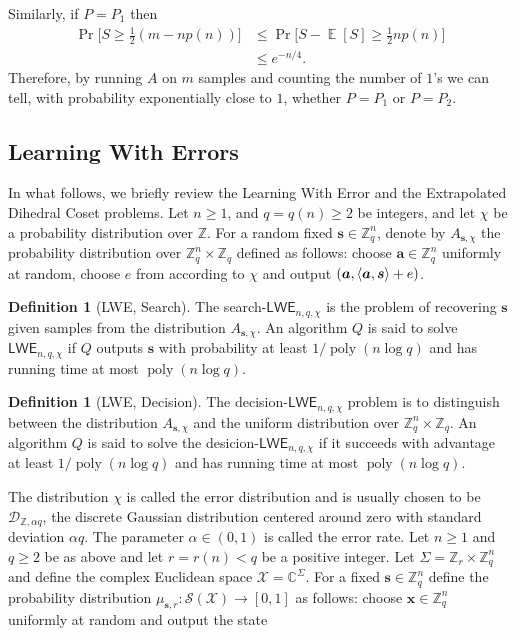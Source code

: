 \documentclass[11pt]{article}
\theoremstyle{plain}
\theoremstyle{definition}
\newtheorem{definition}[theorem]{Definition}
\DeclareMathOperator{\poly}{poly}
\DeclareMathOperator{\E}{\mathbb{E}}
\DeclarePairedDelimiter{\lrang}{\langle}{\rangle}
\def\C{\mathbb{C}}
\def\Z{\mathbb{Z}}
\def\lwe{\mathsf{LWE}}
\def\X{\mathcal{X}}
\def\SX{\mathcal{S(X)}}
\begin{document}
Similarly, if $P = P_1$ then
\begin{align*}
    \Pr\Big[ S \ge \frac{1}{2} (m - np(n)) \Big]
    & \le \Pr\Big[ S - \E[S] \ge \frac{1}{2}np(n) \Big] \\
    & \le e^{-n / 4}.
\end{align*}
Therefore, by running $A$ on $m$ samples and counting the number of $1$'s we can tell, with probability exponentially close to $1$, whether $P = P_1$ or $P = P_2$.



\subsection{Learning With Errors}

In what follows, we briefly review the Learning With Error and the Extrapolated Dihedral Coset problems. Let $n \ge 1$, and $q = q(n) \ge 2$ be integers, and let $\chi$ be a probability distribution over $\Z$. For a random fixed $\bm{s} \in \Z_q^n$, denote by $A_{\bm{s}, \chi}$ the probability distribution over $\Z_q^n \times \Z_q$ defined as follows: choose $\bm{a} \in \Z_q^n$ uniformly at random, choose $e$ from according to $\chi$ and output  $(\bm{a}, \lrang{\bm{a}, \bm{s}} + e)$.
\begin{definition}[LWE, Search]
The search-$\lwe_{n, q, \chi}$ is the problem of recovering $\bm{s}$ given samples from the distribution $A_{\bm{s}, \chi}$. An algorithm $Q$ is said to solve $\lwe_{n, q, \chi}$ if $Q$  outputs $\bm{s}$ with probability at least $1 / \poly(n\log q)$ and has running time at most $\poly(n \log q)$.
\end{definition}
\begin{definition}[LWE, Decision]
    The decision-$\lwe_{n, q, \chi}$ problem is to distinguish between the distribution $A_{\bm{s}, \chi}$ and the uniform distribution over $\Z_q^n \times \Z_q$. An algorithm $Q$ is said to solve the desicion-$\lwe_{n, q, \chi}$ if it succeeds with advantage at least $1 / \poly(n\log q)$ and has running time at most $\poly(n\log q)$. 
\end{definition}
The distribution $\chi$ is called the error distribution and is usually chosen to be $\mathcal{D}_{\Z, \alpha q}$, the discrete Gaussian distribution centered around zero with standard deviation $\alpha q$. The parameter $\alpha \in (0, 1)$ is called the error rate. Let $n \ge 1$ and $q \ge 2$ be as above and let $r = r(n) < q$ be a positive integer. Let $\Sigma = \Z_r \times \Z_q^n$ and define the complex Euclidean space $\X = \C^\Sigma$. For a fixed $\bm{s} \in \Z_q^n$ define the probability distribution $\mu_{\bm{s}, r}: \SX \rightarrow [0, 1]$ as follows: choose $\bm{x} \in \Z_q^n$ uniformly at random and output the state
\end{document}
